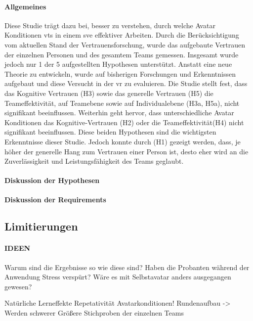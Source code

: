 \documentclass[a4paper,11pt]{article}%
\renewcommand{\\}{\vspace*{0.5\baselineskip} \newline}
\begin{document}
\paragraph{Allgemeines}
	Diese Studie trägt dazu bei, besser zu verstehen, durch welche Avatar Konditionen \ac{vts} in einem \ac{sve} effektiver Arbeiten. Durch die Berücksichtigung vom aktuellen Stand der Vertrauensforschung, wurde das aufgebaute Vertrauen der einzelnen Personen und des gesamtem Teams gemessen. Insgesamt wurde jedoch nur 1 der 5 aufgestellten Hypothesen unterstützt. 
Anstatt eine neue Theorie zu entwickeln, wurde auf bisherigen Forschungen und Erkenntnissen aufgebaut und diese Versucht in der \ac{vr} zu evaluieren.
Die Studie stellt fest, dass das Kognitive Vertrauen (H3) sowie das generelle Vertrauen (H5) die Teameffektivität, auf Teamebene sowie auf Individualebene (H3a, H5a), nicht signifikant beeinflussen. 
Weiterhin geht hervor, dass unterschiedliche Avatar Konditionen das Kognitive-Vertrauen (H2) oder die Teameffektivität(H4) nicht signifikant beeinflussen. Diese beiden Hypothesen sind die wichtigsten Erkenntnisse dieser Studie.
Jedoch konnte durch (H1) gezeigt werden, dass, je höher der generelle Hang zum Vertrauen einer Person ist, desto eher wird an die Zuverlässigkeit und Leistungsfähigkeit des Teams geglaubt.

\paragraph{Diskussion der Hypothesen}
\paragraph{Diskussion der Requirements}
\subsection{Limitierungen}

\paragraph{IDEEN}
Warum sind die Ergebnisse so wie diese sind?
Haben die Probanten während der Anwendung Stress verspürt?
Wäre es mit Selbstavatar anders ausgegangen gewesen?

Natürliche Lerneffekte
Repetativität
Avatarkonditionen!
Rundenaufbau -> Werden schwerer
Größere Stichproben der einzelnen Teams
\end{document}
